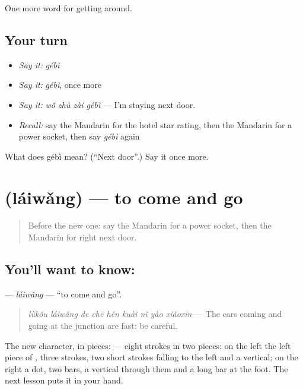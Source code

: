 \begin{grammarlens}[title={What you've built}]
One more word for getting around.
\end{grammarlens}

\subsection*{Your turn}
\begin{itemize}
\raggedright
  \item \emph{Say it:} \emph{gébì}
  \item \emph{Say it:} \emph{gébì}, once more
  \item \emph{Say it:} \emph{wǒ zhù zài gébì} — I'm staying next door.
  \item \emph{Recall:} say the Mandarin for the hotel star rating, then the Mandarin for a power socket, then say \emph{gébì} again
\end{itemize}

\begin{tcolorbox}[breakable,colback=teal!4,colframe=teal!35!black,title={Before you move on}]
What does gébì mean? (\textquotedblleft{}Next door\textquotedblright{}.) Say it once more.
\end{tcolorbox}
\section[\texorpdfstring{\zh{来往} (láiwǎng)}{来往 (láiwǎng)}]{ (láiwǎng) — to come and go}

\label{lesson:ZH-C427-laiwang}



\begin{quote}
Before the new one: say the Mandarin for a power socket, then the Mandarin for right next door.
\end{quote}

\subsection*{You'll want to know: }
\textbf{} — \emph{láiwǎng} — \textquotedblleft{}to come and go\textquotedblright{}.

\begin{quote}
\textbf{} \emph{lùkǒu láiwǎng de chē hěn kuài nǐ yào xiǎoxīn} — The cars coming and going at the junction are fast: be careful.
\end{quote}

The new character, in pieces:  — eight strokes in two pieces: on the left the left piece of , three strokes, two short strokes falling to the left and a vertical; on the right a dot, two bars, a vertical through them and a long bar at the foot. The next lesson puts it in your hand.


